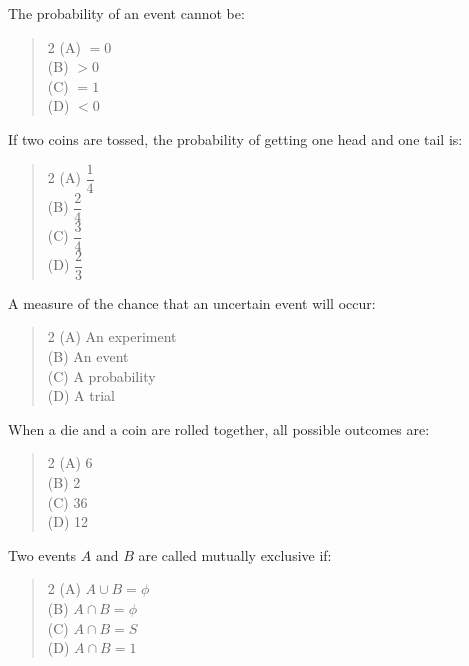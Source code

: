 \documentclass[11pt,a4paper]{article}
\begin{document}
\begin{mcqlist}
\item The probability of an event cannot be:
\begin{quote}\begin{multicols}{2}
\noindent (A) $=0$ \\
(B) $>0$ \\
(C) $=1$ \\
(D) $<0$
\end{multicols}\end{quote}

\item If two coins are tossed, the probability of getting one head and one tail is:
\begin{quote}\begin{multicols}{2}
\noindent (A) $\dfrac{1}{4}$ \\
(B) $\dfrac{2}{4}$ \\
(C) $\dfrac{3}{4}$ \\
(D) $\dfrac{2}{3}$
\end{multicols}\end{quote}

\item A measure of the chance that an uncertain event will occur:
\begin{quote}\begin{multicols}{2}
\noindent (A) An experiment \\
(B) An event \\
(C) A probability \\
(D) A trial
\end{multicols}\end{quote}

\item When a die and a coin are rolled together, all possible outcomes are:
\begin{quote}\begin{multicols}{2}
\noindent (A) 6 \\
(B) 2 \\
(C) 36 \\
(D) 12
\end{multicols}\end{quote}

\item Two events $A$ and $B$ are called mutually exclusive if:
\begin{quote}\begin{multicols}{2}
\noindent (A) $A\cup B=\phi$ \\
(B) $A\cap B=\phi$ \\
(C) $A\cap B=S$ \\
(D) $A\cap B=1$
\end{multicols}\end{quote}


\end{mcqlist}
\end{document}
